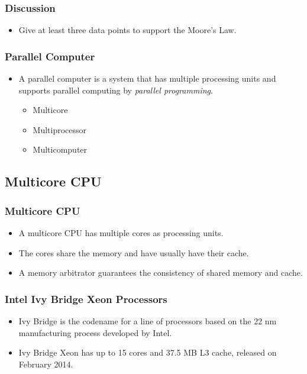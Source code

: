 \documentclass{beamer}
\begin{document}
\begin{CJK}{UTF8}{bsmi}
\begin{frame}
\frametitle{Discussion} 
\begin{itemize}
\item Give at least three data points to support the Moore's Law.
\end{itemize}
\end{frame}


\begin{frame}
\frametitle{Parallel Computer} 
\begin{itemize}
\item A parallel computer is a system that has multiple processing
  units and supports parallel computing by {\em parallel programming}.
\begin{itemize}
\item Multicore
\item Multiprocessor
\item Multicomputer
\end{itemize}
\end{itemize}
\end{frame}


\subsection{Multicore CPU}

\begin{frame}
\frametitle{Multicore CPU}
\begin{itemize}
\item A multicore CPU has multiple cores as processing units.
\item The cores share the memory and have usually have their cache.
\item A memory arbitrator guarantees the consistency of shared memory
  and cache.
\end{itemize}
\end{frame}

\begin{frame}
\frametitle{Intel Ivy Bridge Xeon Processors}
\begin{itemize}
\item Ivy Bridge is the codename for a line of processors based on the
  22 nm manufacturing process developed by Intel.%
\item Ivy Bridge Xeon has up to 15 cores and 37.5 MB L3 cache,
  released on February 2014.
\end{itemize}
\end{frame}


\end{CJK}
\end{document}
